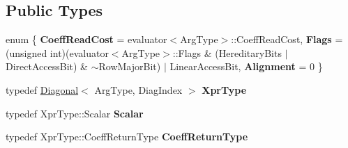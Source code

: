 \subsection*{Public Types}
\begin{DoxyCompactItemize}
\item 
\mbox{\label{struct_eigen_1_1internal_1_1evaluator_3_01_diagonal_3_01_arg_type_00_01_diag_index_01_4_01_4_ac25507693a65e0acd31de1dd5f51bcd6}} 
enum \{ {\bfseries Coeff\+Read\+Cost} = evaluator$<$Arg\+Type$>$\+::Coeff\+Read\+Cost, 
{\bfseries Flags} = (unsigned int)(evaluator$<$Arg\+Type$>$\+::Flags \& (Hereditary\+Bits $\vert$ Direct\+Access\+Bit) \& $\sim$\+Row\+Major\+Bit) $\vert$ Linear\+Access\+Bit, 
{\bfseries Alignment} = 0
 \}
\item 
\mbox{\label{struct_eigen_1_1internal_1_1evaluator_3_01_diagonal_3_01_arg_type_00_01_diag_index_01_4_01_4_af8d8122c47cefe5091e1a5c6a7c83d54}} 
typedef \mbox{\hyperlink{class_eigen_1_1_diagonal}{Diagonal}}$<$ Arg\+Type, Diag\+Index $>$ {\bfseries Xpr\+Type}
\item 
\mbox{\label{struct_eigen_1_1internal_1_1evaluator_3_01_diagonal_3_01_arg_type_00_01_diag_index_01_4_01_4_a59d72134d342c3bb4bafbe2dd9374b58}} 
typedef Xpr\+Type\+::\+Scalar {\bfseries Scalar}
\item 
\mbox{\label{struct_eigen_1_1internal_1_1evaluator_3_01_diagonal_3_01_arg_type_00_01_diag_index_01_4_01_4_abaca8da26790e218ea261aa6ee17dead}} 
typedef Xpr\+Type\+::\+Coeff\+Return\+Type {\bfseries Coeff\+Return\+Type}
\end{DoxyCompactItemize}
